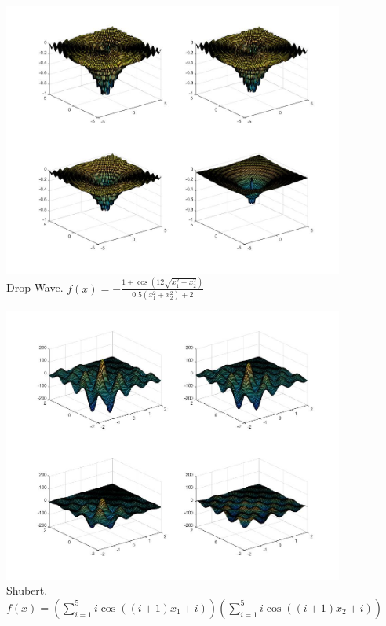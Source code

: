 \documentclass[hyperref={pdfpagelabels=false}]{beamer}
\begin{document}

\begin{frame}
\begin{figure}
\includegraphics[scale=0.24]{dropsmooth.jpg}
\caption{Drop Wave. $f(x)=-\frac{1+\cos(12\sqrt{x_1^2+x_2^2})}{0.5(x_1^2+x_2^2)+2}$}
\end{figure}
\end{frame}


\begin{frame}
\begin{figure}
\includegraphics[scale=0.24]{shubertsmooth.jpg}\\
Shubert.$f(x)=(\sum_{i=1}^5i\cos((i+1)x_1+i))(\sum_{i=1}^5i\cos((i+1)x_2+i))$
\end{figure}
\end{frame}
\end{document}
